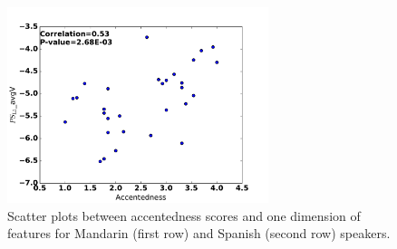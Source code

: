 \begin{figure}[t]
\begin{minipage}[t]{0.5\linewidth}
        \centering
            \includegraphics[width=3in]{figures/seg_scatter/figure2_4.pdf}
        \end{minipage}%
        \caption{Scatter plots between accentedness scores and one dimension of features for Mandarin (first row) and Spanish (second row) speakers.}
        \centering
        \label{fig:seg_scatter}
     \end{figure}

